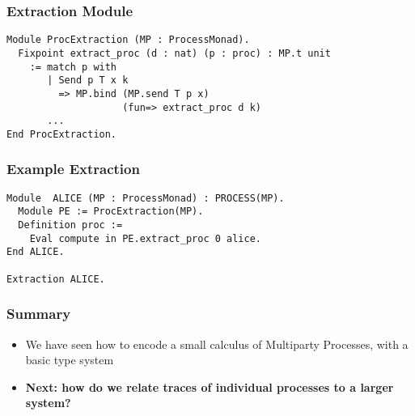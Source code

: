\begin{frame}[fragile]
\frametitle{Extraction Module}
\begin{verbatim}
Module ProcExtraction (MP : ProcessMonad).
  Fixpoint extract_proc (d : nat) (p : proc) : MP.t unit 
    := match p with
       | Send p T x k
         => MP.bind (MP.send T p x)
                    (fun=> extract_proc d k)
       ...
End ProcExtraction.
\end{verbatim}
\end{frame}

\begin{frame}[fragile]
\frametitle{Example Extraction}
\begin{verbatim}
Module  ALICE (MP : ProcessMonad) : PROCESS(MP).
  Module PE := ProcExtraction(MP).
  Definition proc :=
    Eval compute in PE.extract_proc 0 alice.
End ALICE.

Extraction ALICE.
\end{verbatim}
\end{frame}

\begin{frame}[fragile]
\frametitle{Summary}
\begin{sticky}
\begin{itemize}
\item We have seen how to encode a small calculus of Multiparty Processes, with a basic type system
\item \textbf{Next: how do we relate traces of individual processes to a larger system?}
\end{itemize}
\end{sticky}
\end{frame}
